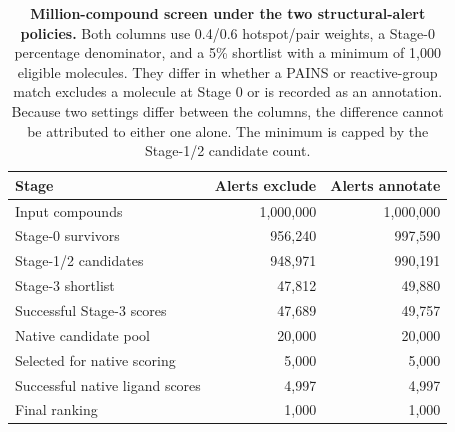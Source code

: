 \begin{table}[htbp]
\centering
\caption{\textbf{Million-compound screen under the two structural-alert policies.} Both columns use 0.4/0.6 hotspot/pair weights, a Stage-0 percentage denominator, and a 5\% shortlist with a minimum of 1,000 eligible molecules. They differ in whether a PAINS or reactive-group match excludes a molecule at Stage 0 or is recorded as an annotation. Because two settings differ between the columns, the difference cannot be attributed to either one alone. The minimum is capped by the Stage-1/2 candidate count.}
\label{tab:floor-headline}
\footnotesize
\setlength{\tabcolsep}{6pt}
\begin{tabular}{@{}lrr@{}}
\toprule
Stage & Alerts exclude & Alerts annotate \\
\midrule
Input compounds & 1,000,000 & 1,000,000 \\
Stage-0 survivors & 956,240 & 997,590 \\
Stage-1/2 candidates & 948,971 & 990,191 \\
Stage-3 shortlist & 47,812 & 49,880 \\
Successful Stage-3 scores & 47,689 & 49,757 \\
Native candidate pool & 20,000 & 20,000 \\
Selected for native scoring & 5,000 & 5,000 \\
Successful native ligand scores & 4,997 & 4,997 \\
Final ranking & 1,000 & 1,000 \\
\bottomrule
\end{tabular}
\end{table}
